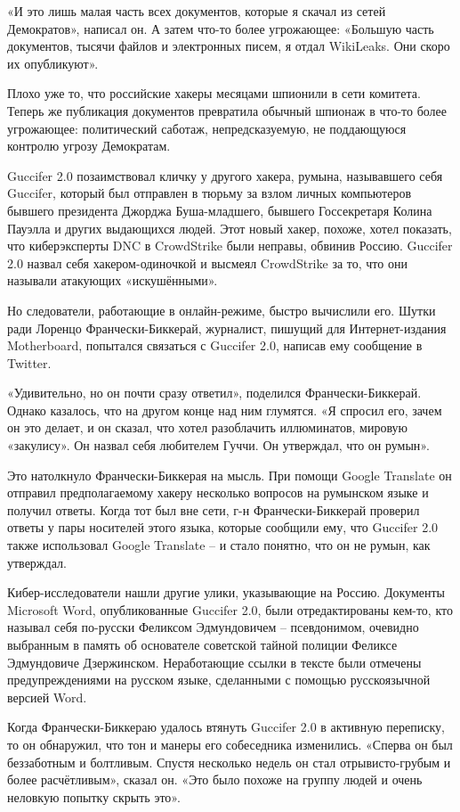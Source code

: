 «И это лишь малая часть всех документов, которые я скачал из сетей
Демократов», написал он. А затем что-то более угрожающее: «Большую часть
документов, тысячи файлов и электронных писем, я отдал WikiLeaks. Они
скоро их опубликуют».

Плохо уже то, что российские хакеры месяцами шпионили в сети комитета.
Теперь же публикация документов превратила обычный шпионаж в что-то
более угрожающее: политический саботаж, непредсказуемую, не поддающуюся
контролю угрозу Демократам.

Guccifer 2.0 позаимствовал кличку у другого хакера, румына, называвшего
себя Guccifer, который был отправлен в тюрьму за взлом личных
компьютеров бывшего президента Джорджа Буша-младшего, бывшего
Госсекретаря Колина Пауэлла и других выдающихся людей. Этот новый хакер,
похоже, хотел показать, что киберэксперты DNC в CrowdStrike были
неправы, обвинив Россию. Guccifer 2.0 назвал себя хакером-одиночкой и
высмеял CrowdStrike за то, что они называли атакующих «искушёнными».

Но следователи, работающие в онлайн-режиме, быстро вычислили его. Шутки
ради Лоренцо Франчески-Биккерай, журналист, пишущий для Интернет-издания
Motherboard, попытался связаться с Guccifer 2.0, написав ему сообщение в
Twitter.

«Удивительно, но он почти сразу ответил», поделился Франчески-Биккерай.
Однако казалось, что на другом конце над ним глумятся. «Я спросил его,
зачем он это делает, и он сказал, что хотел разоблачить иллюминатов,
мировую «закулису». Он назвал себя любителем Гуччи. Он утверждал, что он
румын».

Это натолкнуло Франчески-Биккерая на мысль. При помощи Google Translate
он отправил предполагаемому хакеру несколько вопросов на румынском языке
и получил ответы. Когда тот был вне сети, г-н Франчески-Биккерай
проверил ответы у пары носителей этого языка, которые сообщили ему, что
Guccifer 2.0 также использовал Google Translate -- и стало понятно, что
он не румын, как утверждал.

Кибер-исследователи нашли другие улики, указывающие на Россию. Документы
Microsoft Word, опубликованные Guccifer 2.0, были отредактированы
кем-то, кто называл себя по-русски Феликсом Эдмундовичем -- псевдонимом,
очевидно выбранным в память об основателе советской тайной полиции
Феликсе Эдмундовиче Дзержинском. Неработающие ссылки в тексте были
отмечены предупреждениями на русском языке, сделанными с помощью
русскоязычной версией Word.

Когда Франчески-Биккераю удалось втянуть Guccifer 2.0 в активную
переписку, то он обнаружил, что тон и манеры его собеседника изменились.
«Сперва он был беззаботным и болтливым. Спустя несколько недель он стал
отрывисто-грубым и более расчётливым», сказал он. «Это было похоже на
группу людей и очень неловкую попытку скрыть это».

